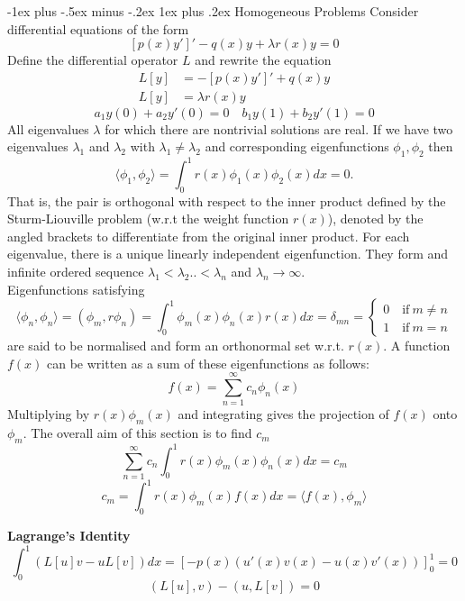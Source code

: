\documentclass[10pt,landscape]{article}
\makeatletter
\newcommand{\lb}{\lambda}
\renewcommand{\subsubsection}{\@startsection{subsubsection}{3}{0mm}%
                                {-1ex plus -.5ex minus -.2ex}%
                                {1ex plus .2ex}%
                                {\normalfont\small\bfseries}}
\makeatother
\begin{document}
\begin{multicols}{2}
        \subsubsection{Homogeneous Problems}
		Consider differential equations of the form\\ $$[ p(x)y']' - q(x)y + \lb r(x)y = 0 $$
		Define the differential operator $L$ and rewrite the equation \\
		\begin{align*}
			L[y] &= -[ p(x)y']'  + q(x)y \\
			L[y] &= \lb r(x)y 
		\end{align*}
		$$a_1 y(0)+a_2y'(0) = 0 \quad b_1y(1) + b_2 y'(1) = 0$$
		All eigenvalues $\lb$ for which there are nontrivial solutions are real. If we have two eigenvalues $\lb_1$ and $\lb_2$ with $\lb_1 \neq \lb_2$ and corresponding eigenfunctions $\phi_1, \phi_2$ then 	$$ \langle \phi_1, \phi_2 \rangle = \int_0^1 r(x)\phi_1(x)\phi_2(x) dx = 0. $$
		That is, the pair is orthogonal with respect to the inner product defined by the Sturm-Liouville problem (w.r.t the weight function $r(x)$), denoted by the angled brackets to differentiate from the original inner product.  For each eigenvalue, there is a unique linearly independent eigenfunction. They form and infinite ordered sequence $\lb_1 < \lb_2 .. < \lb_n$ and $\lb_n \rightarrow \infty$. \\
		Eigenfunctions satisfying \\
        \footnotesize
        $$ \langle \phi_n, \phi_n \rangle = (\phi_m, r\phi_n) = \int_0^1 \phi_m(x)\phi_n (x) r(x) dx = \delta_{mn} =\begin{cases}
		    0 \quad \text{if} \ m\neq n\\
            1 \quad \text{if} \ m = n
		\end{cases} $$\normalsize are said to be normalised and form an orthonormal set w.r.t. $r(x)$. 
		A function $f(x)$ can be written as a sum of these eigenfunctions as follows:\\
		$$ f(x) = \sum_{n=1}^{\infty} c_n \phi_n(x) $$
		Multiplying by $r(x)\phi_m(x)$ and integrating gives the projection of $f(x)$ onto $\phi_m$. The overall aim of this section is to find $c_m$\\
		$$ \sum_{n=1}^{\infty} c_n  \int_0^1 r(x)\phi_m(x)\phi_n(x) dx = c_m $$
		$$ c_m = \int_0^1 r(x)\phi_m(x)f(x) dx= \langle f(x), \phi_m \rangle $$

        \textbf{Lagrange's Identity}\\ $$ \int_0^1 (L[u]v - uL[v]) dx = [-p(x)(u'(x)v(x) - u(x)v'(x))]_0^1 = 0$$
$$  (L[u],v) -(u,L[v]) = 0 $$


\end{multicols}
\end{document}
